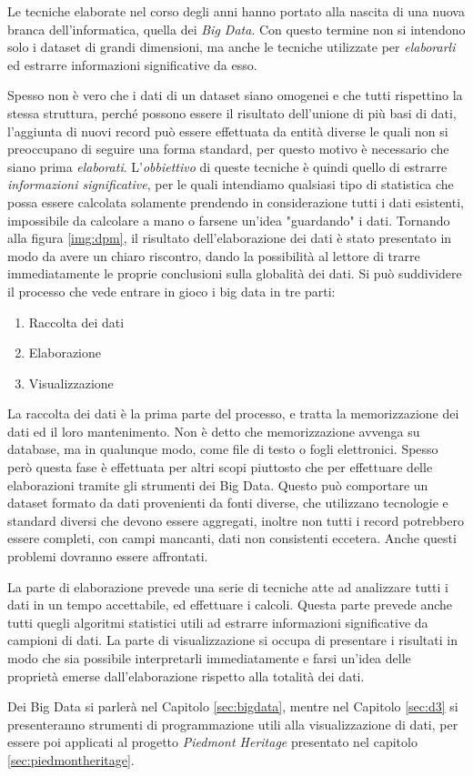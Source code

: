Le tecniche elaborate nel corso degli anni hanno portato alla nascita di una nuova branca dell'informatica, quella dei \emph{Big Data}. Con questo termine non si intendono solo i dataset di grandi dimensioni, ma anche le tecniche utilizzate per \emph{elaborarli} ed estrarre informazioni significative da esso. 

Spesso non è vero che i dati di un dataset siano omogenei e che tutti rispettino la stessa struttura, perché possono essere il risultato dell'unione di più basi di dati, l'aggiunta di nuovi record può essere effettuata da entità diverse le quali non si preoccupano di seguire una forma standard, per questo motivo è necessario che siano prima \emph{elaborati}. L'\emph{obbiettivo} di queste tecniche è quindi quello di estrarre \emph{informazioni significative}, per le quali intendiamo qualsiasi tipo di statistica che possa essere calcolata solamente prendendo in considerazione tutti i dati esistenti, impossibile da calcolare a mano o farsene un'idea "guardando" i dati. Tornando alla figura \ref{img:dpm}, il risultato dell'elaborazione dei dati è stato presentato in modo da avere un chiaro riscontro, dando la possibilità al lettore di trarre immediatamente le proprie conclusioni sulla globalità dei dati.
Si può suddividere il processo che vede entrare in gioco i big data in tre parti:
\begin{enumerate}\label{sec:puntibd}
\item Raccolta dei dati
\item Elaborazione
\item Visualizzazione
\end{enumerate}
La raccolta dei dati è la prima parte del processo, e tratta la memorizzazione dei dati ed il loro mantenimento. Non è detto che memorizzazione avvenga su database, ma in qualunque modo, come file di testo o fogli elettronici. Spesso però questa fase è effettuata per altri scopi piuttosto che per effettuare delle elaborazioni tramite gli strumenti dei Big Data. Questo può comportare un dataset formato da dati provenienti da fonti diverse, che utilizzano tecnologie e standard diversi che devono essere aggregati, inoltre non tutti i record potrebbero essere completi, con campi mancanti, dati non consistenti eccetera. Anche questi problemi dovranno essere affrontati.

La parte di elaborazione prevede una serie di tecniche atte ad analizzare tutti i dati in un tempo accettabile, ed effettuare i calcoli. Questa parte prevede anche tutti quegli algoritmi statistici utili ad estrarre informazioni significative da campioni di dati.
La parte di visualizzazione si occupa di presentare i risultati in modo che sia possibile interpretarli immediatamente e farsi un'idea delle proprietà emerse dall'elaborazione rispetto alla totalità dei dati.

Dei Big Data si parlerà nel Capitolo \ref{sec:bigdata}, mentre nel Capitolo \ref{sec:d3} si presenteranno strumenti di programmazione utili alla visualizzazione di dati, per essere poi applicati al progetto \emph{Piedmont Heritage} presentato nel capitolo \ref{sec:piedmontheritage}.